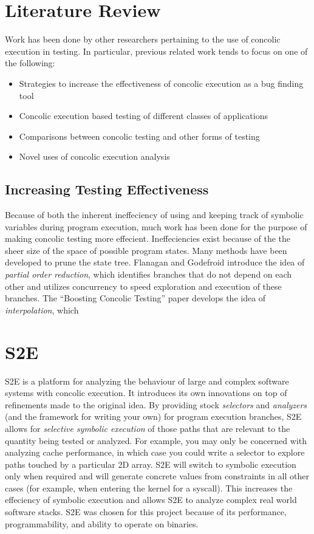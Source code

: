 \section{Literature Review}
Work has been done by other researchers pertaining to the use of concolic
execution in testing. In particular, previous related work
tends to focus on one of the following:
\begin{itemize}
\item Strategies to increase the effectiveness of concolic execution as a bug
finding tool
\item Concolic execution based testing of different classes of applications
\item Comparisons between concolic testing and other forms of testing
\item Novel uses of concolic execution analysis
\end{itemize}

\subsection{Increasing Testing Effectiveness}
Because of both the inherent ineffeciency of using and keeping track of symbolic
variables during program execution, much work has been done for the purpose of
making concolic testing more effecient. Ineffeciencies exist because of the the
sheer size of the space of possible program states. Many methods have been
developed to prune the state tree. Flanagan and Godefroid introduce the idea
of \textit{partial order reduction}, which identifies branches that do not
depend on each other and utilizes concurrency to speed exploration and execution
of these branches. The ``Boosting Concolic Testing'' paper develops the idea
of \textit{interpolation}, which 

\section{S2E}
S2E is a platform for analyzing the behaviour of large and complex software
systems with concolic execution. It introduces its own innovations on top of
refinements made to the original idea. By providing stock \textit{selectors}
and \textit{analyzers} (and the framework for writing your own) for program
execution branches, S2E allows
for \textit{selective symbolic execution} of those paths that are relevant to
the quantity being tested or analyzed. For example, you may only be concerned
with analyzing cache performance, in which case you could write a selector to
explore paths touched by a particular 2D array. S2E will switch to symbolic
execution only when required and will generate concrete values from constraints
in all other cases (for example, when entering the kernel for a syscall). This
increases the effeciency of symbolic execution and allows S2E to analyze
complex real world software stacks. S2E was chosen for this project because of
its performance, programmability, and ability to operate on binaries. 



 


